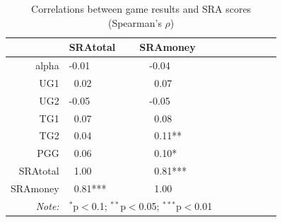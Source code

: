 \documentclass[12pt]{article}
\begin{document}
\begin{table}[!htbp] \centering 
  \caption{Correlations between game results and SRA scores (Spearman\rq s \(\rho\))} 
  \label{} 
\centering
\begin{tabular}{rllllllll}
  \hline
 & SRAtotal & SRAmoney \\ 
  \hline
alpha  & -0.01  & \ \ -0.04  \\ 
  UG1  &  \ 0.02  &  \ \ \ 0.07  \\ 
  UG2 & -0.05  & \ \ -0.05  \\ 
  TG1 &  \ 0.07  &  \ \ \ 0.08  \\ 
  TG2  &  \ 0.04  & \ \ \  0.11** \\ 
  PGG  & \  0.06  &  \ \ \ 0.10* \\ 
  SRAtotal &  \ 1.00  &  \ \ \ 0.81*** \\ 
  SRAmoney  &  \ 0.81*** &  \ \ \ 1.00  \\ 
   \hline
   \textit{Note:}  & \multicolumn{2}{r}{$^{*}$p$<$0.1; $^{**}$p$<$0.05; $^{***}$p$<$0.01} \\ 
\end{tabular}
\end{table}
\end{document}
